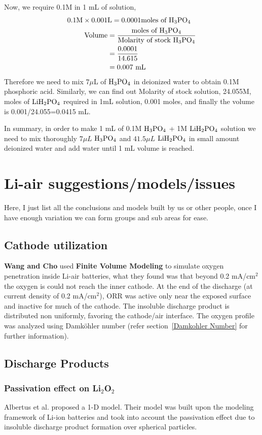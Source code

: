 \documentclass[12pt]{book}
\begin{document}
 Now, we require 0.1M in 1 mL of solution,
 \begin{align}
0.1\textrm{M}\times 0.001&\textrm{L} = 0.0001\textrm{moles of }\ce{H3PO4}\nonumber\\
\textrm{Volume}&=\frac{\textrm{moles of }\ce{H3PO4}}{\textrm{Molarity of stock }\ce{H3PO4}}\\
&=\frac{0.0001}{14.615}\nonumber\\
&=0.007\textrm{ mL}\nonumber
 \end{align}
 Therefore we need to mix $7 \mu$L of $\ce{H3PO4}$ in deionized water to obtain 0.1M phosphoric acid. Similarly, we can find out Molarity of stock solution, 24.055M, moles of $\ce{LiH2PO4}$ required in 1mL solution, 0.001 moles, and finally the volume is 0.001/24.055=0.0415 mL.

 In summary,
 in order to make 1 mL of 0.1M $\ce{H3PO4}$ + 1M $\ce{LiH2PO4}$ solution we need to mix thoroughly $7\mu L$ $\ce{H3PO4}$ and $41.5\mu L$ $\ce{LiH2PO4}$ in small amount deionized water and add water until 1 mL volume is reached. 
 
 
\chapter{Li-air suggestions/models/issues}
Here, I just list all the conclusions and models built by us or other people, once I have enough variation we can form groups and sub areas for ease.

\section{Cathode utilization} 
\textbf{Wang and Cho} used \textbf{Finite Volume Modeling} to simulate oxygen penetration inside Li-air batteries, what they found was that beyond 0.2 mA/cm$^2$ the oxygen is could not reach the inner cathode. At the end of the discharge (at current density of 0.2 mA/cm$^2$), ORR was active only near the exposed surface and inactive for much of the cathode. The insoluble discharge product is distributed non uniformly, favoring the cathode/air interface. The oxygen profile was analyzed using Damk\"{o}hler number (refer section~\ref{Damkohler Number} for further information).

\section{Discharge Products}
\subsection{Passivation effect on Li$_2$O$_2$}
Albertus et al. proposed a 1-D model. Their model was built upon the modeling framework of Li-ion batteries and took into account the passivation effect due to insoluble discharge product formation over spherical particles.\cite{Albertus2011}
\end{document}
